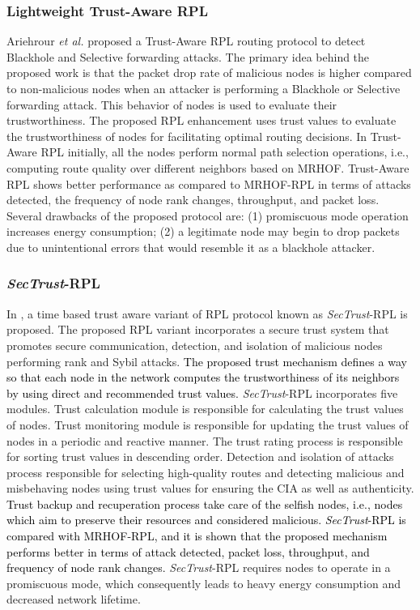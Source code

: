 \documentclass[10pt,journal,sort & compress]{IEEEtran}
\begin{document}
\subsubsection*{Lightweight Trust-Aware RPL}

Ariehrour \textit{et al.} \cite{Airehrour2017AJTDE} proposed a Trust-Aware RPL routing protocol to detect Blackhole and Selective forwarding attacks. The primary idea behind the proposed work is that the packet drop rate of malicious nodes is higher compared to non-malicious nodes when an attacker is performing a Blackhole or Selective forwarding attack. This behavior of nodes is used to evaluate their trustworthiness. The proposed RPL enhancement uses trust values to evaluate the trustworthiness of nodes for facilitating optimal routing decisions. In Trust-Aware RPL initially, all the nodes perform normal path selection operations, i.e., computing route quality over different neighbors based on MRHOF. Trust-Aware RPL shows better performance as compared to MRHOF-RPL in terms of attacks detected, the frequency of node rank changes, throughput, and packet loss. Several drawbacks of the proposed protocol are: (1) promiscuous mode operation increases energy consumption; (2) a legitimate node may begin to drop packets due to unintentional errors that would resemble it as a blackhole attacker.         

\subsubsection*{\textit{\textit{SecTrust}}-RPL}
In \cite{Airehrour2018}, a time based trust aware variant of RPL protocol known as \textit{SecTrust}-RPL is proposed. The proposed RPL variant incorporates a secure trust system that promotes secure communication, detection, and isolation of malicious nodes performing rank and Sybil attacks. \textcolor{black}{The proposed trust mechanism defines a way so that each node in the network computes the trustworthiness of its neighbors by using direct and recommended trust values.} \textit{SecTrust}-RPL incorporates five modules. Trust calculation module is responsible for calculating the trust values of nodes. Trust monitoring module is responsible for updating the trust values of nodes in a periodic and reactive manner. The trust rating process is responsible for sorting trust values in descending order. Detection and isolation of attacks process responsible for selecting high-quality routes and detecting malicious and misbehaving nodes using trust values for ensuring the CIA as well as authenticity. \textcolor{black}{Trust backup and recuperation process take care of the selfish nodes, i.e., nodes which aim to preserve their resources and considered malicious. \textit{SecTrust}-RPL is compared with MRHOF-RPL, and it is shown that the proposed mechanism performs better in terms of attack detected, packet loss, throughput, and frequency of node rank changes.} \textit{SecTrust}-RPL requires nodes to operate in a promiscuous mode, which consequently leads to heavy energy consumption and decreased network lifetime. 
\end{document}
